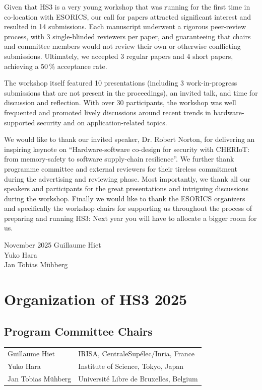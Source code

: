 \documentclass[runningheads]{llncs}
\begin{document}
Given that HS3 is a very young workshop that was running for the first time
in co-location with ESORICS, our call for papers attracted significant
interest and resulted in 14 submissions. Each manuscript underwent a
rigorous peer-review process, with 3 single-blinded reviewers per paper,
and guaranteeing that chairs and committee members would not review their
own or otherwise conflicting submissions. Ultimately, we accepted 3 regular
papers and 4 short papers, achieving a 50\,\% acceptance rate.

The workshop itself featured 10 presentations (including 3 work-in-progress
submissions that are not present in the proceedings), an invited talk, and
time for discussion and reflection. With over 30 participants, the workshop
was well frequented and promoted lively discussions around recent trends in
hardware-supported security and on application-related topics.

We would like to thank our invited speaker, Dr. Robert Norton, for
delivering an inspiring keynote on \enquote{Hardware-software co-design for
security with CHERIoT: from memory-safety to software supply-chain
resilience}. We further thank programme committee and external reviewers
for their tireless commitment during the advertising and reviewing phase.
Most importantly, we thank all our speakers and participants for the great
presentations and intriguing discussions during the workshop. Finally we
would like to thank the ESORICS organizers and specifically the workshop
chairs for supporting us throughout the process of preparing and running
HS3: Next year you will have to allocate a bigger room for us.

\medskip

\begin{flushright}
\noindent November 2025\hfill
{Guillaume Hiet} \\
{Yuko Hara} \\
{Jan Tobias M\"uhberg} \\
\end{flushright}


\chapter*{Organization of HS3 2025}
\setlength{\tabcolsep}{0pt}     %
\setlength{\LTpre}{0pt}         %

\section*{Program Committee Chairs}
\begin{longtable}{p{}p{}}
Guillaume Hiet       & IRISA, CentraleSup\'elec/Inria, France \\
Yuko Hara            & Institute of Science, Tokyo, Japan \\
Jan Tobias M\"uhberg & Universit\'e Libre de Bruxelles, Belgium \\
\end{longtable}
\end{document}
